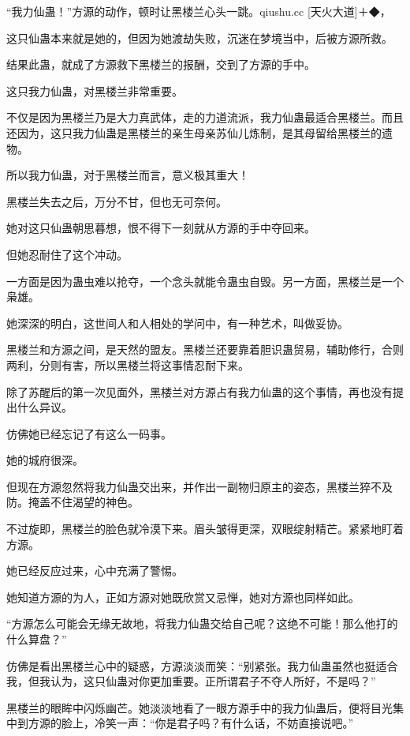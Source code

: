 
\begin{this_body}

“我力仙蛊！”方源的动作，顿时让黑楼兰心头一跳。qiushu.cc [天火大道]＋◆，

这只仙蛊本来就是她的，但因为她渡劫失败，沉迷在梦境当中，后被方源所救。

结果此蛊，就成了方源救下黑楼兰的报酬，交到了方源的手中。

这只我力仙蛊，对黑楼兰非常重要。

不仅是因为黑楼兰乃是大力真武体，走的力道流派，我力仙蛊最适合黑楼兰。而且还因为，这只我力仙蛊是黑楼兰的亲生母亲苏仙儿炼制，是其母留给黑楼兰的遗物。

所以我力仙蛊，对于黑楼兰而言，意义极其重大！

黑楼兰失去之后，万分不甘，但也无可奈何。

她对这只仙蛊朝思暮想，恨不得下一刻就从方源的手中夺回来。

但她忍耐住了这个冲动。

一方面是因为蛊虫难以抢夺，一个念头就能令蛊虫自毁。另一方面，黑楼兰是一个枭雄。

她深深的明白，这世间人和人相处的学问中，有一种艺术，叫做妥协。

黑楼兰和方源之间，是天然的盟友。黑楼兰还要靠着胆识蛊贸易，辅助修行，合则两利，分则有害，所以黑楼兰将这事情忍耐下来。

除了苏醒后的第一次见面外，黑楼兰对方源占有我力仙蛊的这个事情，再也没有提出什么异议。

仿佛她已经忘记了有这么一码事。

她的城府很深。

但现在方源忽然将我力仙蛊交出来，并作出一副物归原主的姿态，黑楼兰猝不及防。掩盖不住渴望的神色。

不过旋即，黑楼兰的脸色就冷漠下来。眉头皱得更深，双眼绽射精芒。紧紧地盯着方源。

她已经反应过来，心中充满了警惕。

她知道方源的为人，正如方源对她既欣赏又忌惮，她对方源也同样如此。

“方源怎么可能会无缘无故地，将我力仙蛊交给自己呢？这绝不可能！那么他打的什么算盘？”

仿佛是看出黑楼兰心中的疑惑，方源淡淡而笑：“别紧张。我力仙蛊虽然也挺适合我，但我认为，这只仙蛊对你更加重要。正所谓君子不夺人所好，不是吗？”

黑楼兰的眼眸中闪烁幽芒。她淡淡地看了一眼方源手中的我力仙蛊后，便将目光集中到方源的脸上，冷笑一声：“你是君子吗？有什么话，不妨直接说吧。”


\end{this_body}
